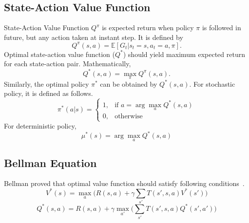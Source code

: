 \subsection{State-Action Value Function}

State-Action Value Function $Q^{\pi}$ is expected return when policy $\pi$ is followed in future, 
but any action taken at instant step. It is defined by
\begin{equation}
Q^{\pi}(s,a) = \mathbb{E}[G_t|s_t=s, a_t=a, \pi]. %
\end{equation}
Optimal state-action value function ($Q^{*}$) should yield maximum expected return for each state-action pair. 
Mathematically,  
\begin{equation}
Q^{*}(s,a) = \max_{\pi} Q^{\pi}(s,a).
\end{equation}
Similarly, the optimal policy $\pi^*$ can be obtained by $Q^{*}(s,a)$. For stochastic policy, it is defined as follows.
\begin{equation}
\label{eqn:policy_stochastic_q}
\pi^{*}(a|s) = 
\begin{cases}
1,   & \text{if  } a = \arg\max_{a} Q^{*}(s,a) \\
0,   & \text{otherwise  }
\end{cases} 
\end{equation}
For deterministic policy, 
\begin{equation}
\label{eqn:policy_deterministic_q}
\mu^{*}(s) = \arg\max_{a} Q^{*}(s,a)
\end{equation}

\subsection{Bellman Equation}

Bellman proved that optimal value function should satisfy following conditions~\cite{bellman_dynamic_2003}. 
\begin{equation}
\label{eqn:bellman_v}
V^{*}(s) = \max_{a} \big( R(s,a) + \gamma \sum_{s'} T(s',s,a) V^{*}(s') \big)
\end{equation}
\begin{equation}
\label{eqn:bellman_q}
Q^{*}(s,a) = R(s,a) + \gamma \max_{a'} \big( \sum_{s'} T(s',s,a) Q^{*}(s',a') \big)
\end{equation}
